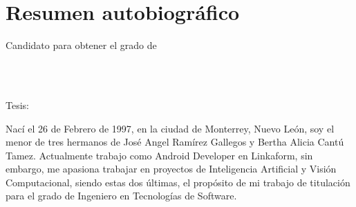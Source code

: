 
\chapter*{Resumen autobiográfico}
\thispagestyle{empty}

\begin{center}
\autor

Candidato para obtener el grado de\\
\grado\\
\orientacion\bigskip

\uanl\\
\fime\bigskip

Tesis:\\
\textsc{\large\titulo}
\end{center}\bigskip

Nací el 26 de Febrero de 1997, en la ciudad de Monterrey, Nuevo León, soy el menor de tres hermanos de José Angel Ramírez Gallegos y Bertha Alicia Cantú Tamez. Actualmente trabajo como Android Developer en Linkaform, sin embargo, me apasiona trabajar en proyectos de Inteligencia Artificial y Visión Computacional, siendo estas dos últimas, el propósito de mi trabajo de titulación para el grado de Ingeniero en Tecnologías de Software.

